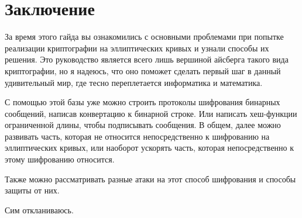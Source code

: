 
\section{Заключение}
За время этого гайда вы ознакомились с основными проблемами при попытке реализации криптографии на эллиптических кривых и узнали способы их решения. Это руководство является всего лишь вершиной айсберга такого вида криптографии, но я надеюсь, что оно поможет сделать первый шаг в данный удивительный мир, где тесно переплетается информатика и математика.

С помощью этой базы уже можно строить протоколы шифрования бинарных сообщений, написав конвертацию к бинарной строке. Или написать хеш-функции ограниченной длины, чтобы подписывать сообщения. В общем, далее можно развивать часть, которая не относится непосредственно к шифрованию на эллиптических кривых, или наоборот ускорять часть, которая непосредственно к этому шифрованию относится.

Также можно рассматривать разные атаки на этот способ шифрования и способы защиты от них.

Сим откланиваюсь.

